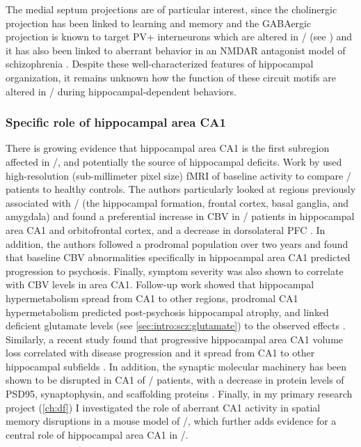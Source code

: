 The medial septum projections are of particular interest, since the cholinergic projection has been linked to learning and memory \citep{Parent2004} and the GABAergic projection is known to target PV+ interneurons \citep{Freund1988} which are altered in \scz/ (see ) and it has also been linked to aberrant behavior in an NMDAR antagonist model of schizophrenia \citep{Ma2012}.
Despite these well-characterized features of hippocampal organization, it remains unknown how the function of these circuit motifs are altered in \scz/ during hippocampal-dependent behaviors.

\subsubsection{Specific role of hippocampal area CA1}
There is growing evidence that hippocampal area CA1 is the first subregion affected in \scz/, and potentially the source of hippocampal deficits.
Work by \citeauthor{Schobel2009} used high-resolution (sub-millimeter pixel size) \ac{fMRI} of baseline activity to compare \scz/ patients to healthy controls.
The authors particularly looked at regions previously associated with \scz/ (the hippocampal formation, frontal cortex, basal ganglia, and amygdala) and found a preferential increase in \ac{CBV} in \scz/ patients in hippocampal area CA1 and orbitofrontal cortex, and a decrease in dorsolateral PFC \citep{Schobel2009}.
In addition, the authors followed a prodromal population over two years and found that baseline \ac{CBV} abnormalities specifically in hippocampal area CA1 predicted progression to psychosis.
Finally, symptom severity was also shown to correlate with \ac{CBV} levels in area CA1. Follow-up work showed that hippocampal hypermetabolism spread from CA1 to other regions, prodromal CA1 hypermetabolism predicted post-psychosis hippocampal atrophy, and linked deficient glutamate levels (see \autoref{sec:intro:scz:glutamate}) to the observed effects \citep{Schobel2013}.
Similarly, a recent study found that progressive hippocampal area CA1 volume loss correlated with disease progression and it spread from CA1 to other hippocampal subfields \citep{Ho2017}.
In addition, the synaptic molecular machinery has been shown to be disrupted in CA1 of \scz/ patients, with a decrease in protein levels of PSD95, synaptophysin, and scaffolding proteins \citep{Matosin2016}. 
Finally, in my primary research project (\autoref{ch:df}) I investigated the role of aberrant CA1 activity in spatial memory disruptions in a mouse model of \scz/, which further adds evidence for a central role of hippocampal area CA1 in \scz/.

